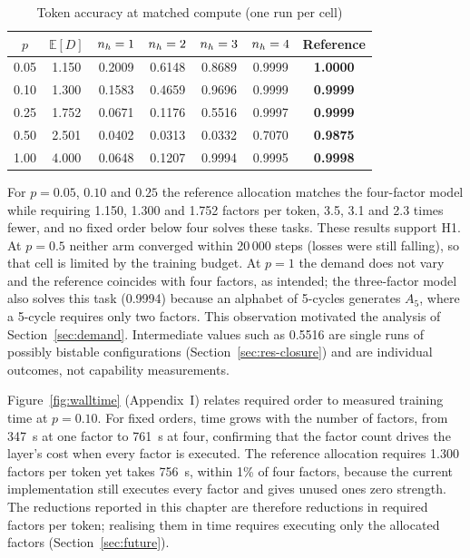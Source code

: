 \begin{table}[ht]
	\caption{Token accuracy at matched compute (one run per cell)}
	\centering
	\begin{tabular}{c c c c c c c}
		\toprule
		$p$ & $\mathbb{E}[D]$ & $n_h=1$ & $n_h=2$ & $n_h=3$ & $n_h=4$ & \textbf{Reference} \\
		\midrule
		0.05 & 1.150 & 0.2009 & 0.6148 & 0.8689 & 0.9999 & \textbf{1.0000} \\
		0.10 & 1.300 & 0.1583 & 0.4659 & 0.9696 & 0.9999 & \textbf{0.9999} \\
		0.25 & 1.752 & 0.0671 & 0.1176 & 0.5516 & 0.9997 & \textbf{0.9999} \\
		0.50 & 2.501 & 0.0402 & 0.0313 & 0.0332 & 0.7070 & \textbf{0.9875} \\
		1.00 & 4.000 & 0.0648 & 0.1207 & 0.9994 & 0.9995 & \textbf{0.9998} \\
		\bottomrule
	\end{tabular}
	\label{tab:matched}
\end{table}

For $p = 0.05$, $0.10$ and $0.25$ the reference allocation matches the four-factor model while requiring 1.150, 1.300 and 1.752 factors per token, 3.5, 3.1 and 2.3 times fewer, and no fixed order below four solves these tasks. These results support H1. At $p=0.5$ neither arm converged within 20\,000 steps (losses were still falling), so that cell is limited by the training budget. At $p=1$ the demand does not vary and the reference coincides with four factors, as intended; the three-factor model also solves this task (0.9994) because an alphabet of 5-cycles generates $A_5$, where a 5-cycle requires only two factors. This observation motivated the analysis of Section~\ref{sec:demand}. Intermediate values such as 0.5516 are single runs of possibly bistable configurations (Section~\ref{sec:res-closure}) and are individual outcomes, not capability measurements.


Figure~\ref{fig:walltime} (Appendix~I) relates required order to measured training time at $p=0.10$. For fixed orders, time grows with the number of factors, from 347~s at one factor to 761~s at four, confirming that the factor count drives the layer's cost when every factor is executed. The reference allocation requires 1.300 factors per token yet takes 756~s, within 1\% of four factors, because the current implementation still executes every factor and gives unused ones zero strength. The reductions reported in this chapter are therefore reductions in required factors per token; realising them in time requires executing only the allocated factors (Section~\ref{sec:future}).

